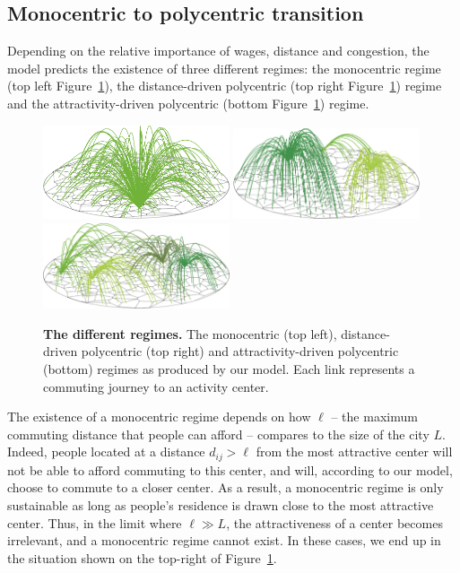 \subsection{Monocentric to polycentric transition}
\label{sub:monocentric_to_polycentric_transition}

Depending on the relative importance of wages, distance and congestion, the
model predicts the existence of three different regimes: the monocentric regime
(top left Figure~\ref{fig:model_results}), the distance-driven polycentric (top
right Figure~\ref{fig:model_results}) regime and the attractivity-driven
polycentric (bottom Figure~\ref{fig:model_results}) regime.\\


\begin{figure}
    \centering
    \includegraphics[width=0.49\textwidth]{gfx/chapter-monocentric/1.pdf}
    \includegraphics[width=0.49\textwidth]{gfx/chapter-monocentric/2.pdf}
    \includegraphics[width=0.49\textwidth]{gfx/chapter-monocentric/3.pdf}
    \caption{{\bf The different regimes.} The monocentric (top left), distance-driven polycentric (top right)
      and attractivity-driven polycentric (bottom) regimes as produced by
      our model. Each link represents a commuting journey to an activity center. \label{fig:model_results}}
\end{figure}

The existence of a monocentric regime depends on how $\ell$ -- the maximum
commuting distance that people can afford -- compares to the size of the city
$L$. Indeed, people located at a distance $d_{ij} > \ell$ from the most
attractive center will not be able to afford commuting to this center, and will,
according to our model, choose to commute to a closer center.  As a result, a
monocentric regime is only sustainable as long as people's residence is drawn
close to the most attractive center. Thus, in the limit where $\ell \gg L$, the
attractiveness of a center becomes irrelevant, and a monocentric regime cannot
exist. In these cases, we end up in the situation shown on the top-right of
Figure~\ref{fig:model_results}.\\


